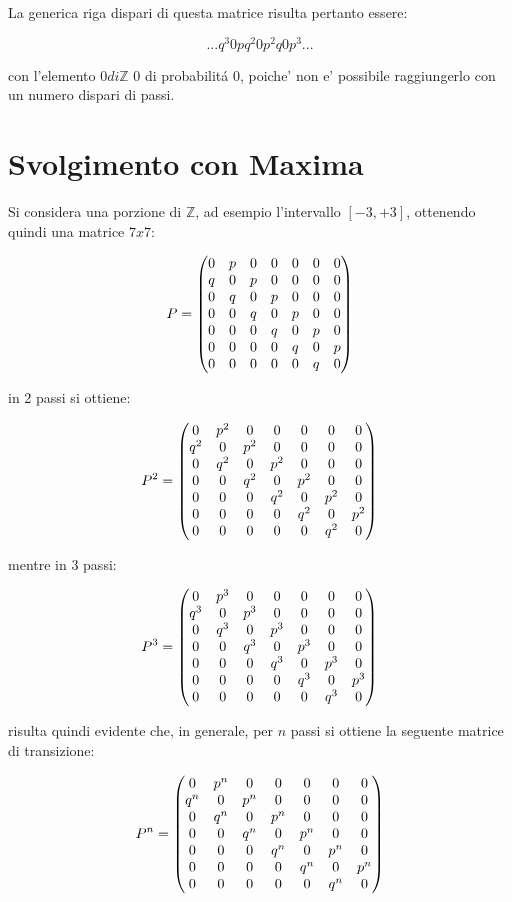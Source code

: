 \documentclass{article}
\begin{document}
La generica riga dispari di questa matrice risulta pertanto essere:

$$ ... q^3 0 pq^2 0 p^2q 0 p^3 ... $$ 

con l'elemento $0 di \mathbb{Z}$ 0 di probabilit\'{a} 0, poiche' non e' possibile raggiungerlo con un numero dispari di passi. 

\section{Svolgimento con Maxima}
Si considera una porzione di $\mathbb{Z}$, ad esempio l'intervallo $[-3, +3]$, ottenendo quindi una matrice $7x7$:

$$P = \begin{pmatrix}0 & p & 0 & 0 & 0 & 0 & 0\cr q & 0 & p & 0 & 0 & 0 & 0\cr 0 & q & 0 & p & 0 & 0 & 0\cr 0 & 0 & q & 0 & p & 0 & 0\cr 0 & 0 & 0 & q & 0 & p & 0\cr 0 & 0 & 0 & 0 & q & 0 & p\cr 0 & 0 & 0 & 0 & 0 & q & 0\end{pmatrix}$$

in 2 passi si ottiene:

$$P^2 = \begin{pmatrix}0 & {p}^{2} & 0 & 0 & 0 & 0 & 0\cr {q}^{2} & 0 & {p}^{2} & 0 & 0 & 0 & 0\cr 0 & {q}^{2} & 0 & {p}^{2} & 0 & 0 & 0\cr 0 & 0 & {q}^{2} & 0 & {p}^{2} & 0 & 0\cr 0 & 0 & 0 & {q}^{2} & 0 & {p}^{2} & 0\cr 0 & 0 & 0 & 0 & {q}^{2} & 0 & {p}^{2}\cr 0 & 0 & 0 & 0 & 0 & {q}^{2} & 0\end{pmatrix}$$

mentre in 3 passi:

$$P^3 = \begin{pmatrix}0 & {p}^{3} & 0 & 0 & 0 & 0 & 0\cr {q}^{3} & 0 & {p}^{3} & 0 & 0 & 0 & 0\cr 0 & {q}^{3} & 0 & {p}^{3} & 0 & 0 & 0\cr 0 & 0 & {q}^{3} & 0 & {p}^{3} & 0 & 0\cr 0 & 0 & 0 & {q}^{3} & 0 & {p}^{3} & 0\cr 0 & 0 & 0 & 0 & {q}^{3} & 0 & {p}^{3}\cr 0 & 0 & 0 & 0 & 0 & {q}^{3} & 0\end{pmatrix}$$

risulta quindi evidente che, in generale, per $n$ passi si ottiene la seguente matrice di transizione:

$$P^n=\begin{pmatrix}0 & {p}^{n} & 0 & 0 & 0 & 0 & 0\cr {q}^{n} & 0 & {p}^{n} & 0 & 0 & 0 & 0\cr 0 & {q}^{n} & 0 & {p}^{n} & 0 & 0 & 0\cr 0 & 0 & {q}^{n} & 0 & {p}^{n} & 0 & 0\cr 0 & 0 & 0 & {q}^{n} & 0 & {p}^{n} & 0\cr 0 & 0 & 0 & 0 & {q}^{n} & 0 & {p}^{n}\cr 0 & 0 & 0 & 0 & 0 & {q}^{n} & 0\end{pmatrix}$$ 
\end{document}
